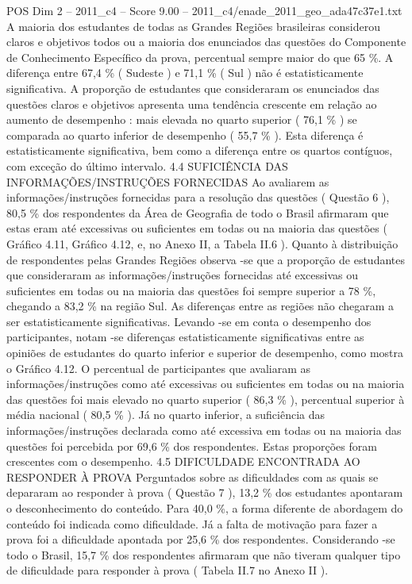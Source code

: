 \begin{textsample}{POS Dim 2 – 2011\_c4 – Score 9.00 – 2011\_c4/enade\_2011\_geo\_ada47c37e1.txt}
A maioria dos estudantes de todas as Grandes Regiões brasileiras considerou claros e objetivos todos ou a maioria dos enunciados das questões do Componente de Conhecimento Específico da prova, percentual sempre maior do que 65 \%.
A diferença entre 67,4 \% ( Sudeste ) e 71,1 \% ( Sul ) não é estatisticamente significativa.
A proporção de estudantes que consideraram os enunciados das questões claros e objetivos apresenta uma tendência crescente em relação ao aumento de desempenho : mais elevada no quarto superior ( 76,1 \% ) se comparada ao quarto inferior de desempenho ( 55,7 \% ).
Esta diferença é estatisticamente significativa, bem como a diferença entre os quartos contíguos, com exceção do último intervalo. 4.4 SUFICIÊNCIA DAS INFORMAÇÕES/INSTRUÇÕES FORNECIDAS Ao avaliarem as informações/instruções fornecidas para a resolução das questões ( Questão 6 ), 80,5 \% dos respondentes da Área de Geografia de todo o Brasil afirmaram que estas eram até excessivas ou suficientes em todas ou na maioria das questões ( Gráfico 4.11, Gráfico 4.12, e, no Anexo II, a Tabela II.6 ).
Quanto à distribuição de respondentes pelas Grandes Regiões observa -se que a proporção de estudantes que consideraram as informações/instruções fornecidas até excessivas ou suficientes em todas ou na maioria das questões foi sempre superior a 78 \%, chegando a 83,2 \% na região Sul.
As diferenças entre as regiões não chegaram a ser estatisticamente significativas.
Levando -se em conta o desempenho dos participantes, notam -se diferenças estatisticamente significativas entre as opiniões de estudantes do quarto inferior e superior de desempenho, como mostra o Gráfico 4.12.
O percentual de participantes que avaliaram as informações/instruções como até excessivas ou suficientes em todas ou na maioria das questões foi mais elevado no quarto superior ( 86,3 \% ), percentual superior à média nacional ( 80,5 \% ).
Já no quarto inferior, a suficiência das informações/instruções declarada como até excessiva em todas ou na maioria das questões foi percebida por 69,6 \% dos respondentes.
Estas proporções foram crescentes com o desempenho. 4.5 DIFICULDADE ENCONTRADA AO RESPONDER À PROVA Perguntados sobre as dificuldades com as quais se depararam ao responder à prova ( Questão 7 ), 13,2 \% dos estudantes apontaram o desconhecimento do conteúdo.
Para 40,0 \%, a forma diferente de abordagem do conteúdo foi indicada como dificuldade.
Já a falta de motivação para fazer a prova foi a dificuldade apontada por 25,6 \% dos respondentes.
Considerando -se todo o Brasil, 15,7 \% dos respondentes afirmaram que não tiveram qualquer tipo de dificuldade para responder à prova ( Tabela II.7 no Anexo II ).

\end{textsample}
